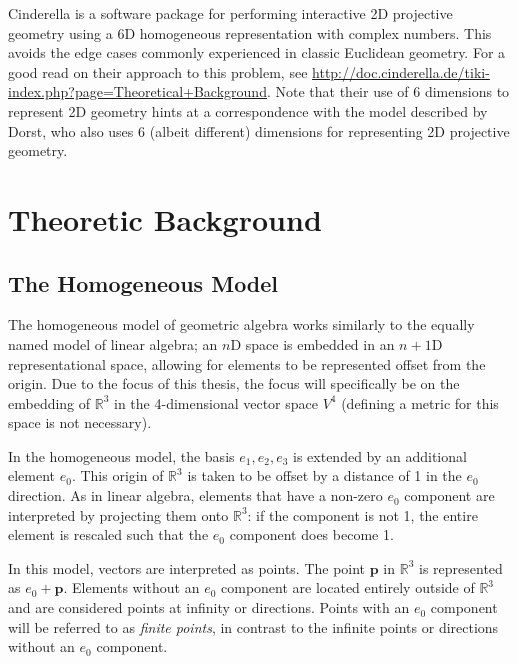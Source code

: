 \documentclass[a4paper, 10pt]{article}
\begin{document}
Cinderella\cite{richter1999interactive} is a software package for performing
interactive 2D projective geometry using a 6D homogeneous representation with
complex numbers. This avoids the edge cases commonly experienced in classic
Euclidean geometry. For a good read on their approach to this problem, see
\url{http://doc.cinderella.de/tiki-index.php?page=Theoretical+Background}.
Note that their use of 6 dimensions to represent 2D geometry hints at a
correspondence with the model described by Dorst, who also uses 6 (albeit
different) dimensions for representing 2D projective geometry.

\section{Theoretic Background}
\label{sec:background}

\subsection{The Homogeneous Model}
The homogeneous model of geometric algebra works similarly to the equally named
model of linear algebra; an $n$D space is embedded in an $n+1$D representational
space, allowing for elements to be represented offset from the origin. Due to
the focus of this thesis, the focus will specifically be on the embedding of
$\mathbb{R}^3$ in the 4-dimensional vector space $V^4$ (defining a metric for
this space is not necessary).

In the homogeneous model, the basis ${e_1, e_2, e_3}$ is extended by an
additional element $e_0$. This origin of $\mathbb{R}^3$ is taken to be offset by
a distance of 1 in the $e_0$ direction. As in linear algebra, elements that have
a non-zero $e_0$ component are interpreted by projecting them onto
$\mathbb{R}^3$: if the component is not 1, the entire element is rescaled such
that the $e_0$ component does become 1.

In this model, vectors are interpreted as points. The point $\mathbf{p}$ in
$\mathbb{R}^3$ is represented as $e_0 + \mathbf{p}$. Elements without an $e_0$
component are located entirely outside of $\mathbb{R}^3$ and are considered
points at infinity or directions. Points with an $e_0$ component will be
referred to as \emph{finite points}, in contrast to the infinite points or
directions without an $e_0$ component.
\end{document}
